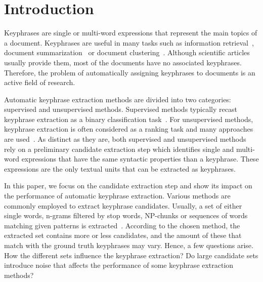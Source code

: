\section{Introduction}
\label{sec:section}
  Keyphrases are single or multi-word expressions that represent the main topics
  of a document. Keyphrases are useful in many tasks such as information
  retrieval~\cite{medelyan2008smalltrainingset}, document
  summarization~\cite{litvak2008graphbased} or document
  clustering~\cite{han2007webdocumentclustering}. Although scientific articles
  usually provide them, most of the documents have no associated keyphrases.
  Therefore, the problem of automatically assigning keyphrases to documents is
  an active field of research.

  Automatic keyphrase extraction methods are divided into two categories:
  supervised and unsupervised methods. Supervised methods typically recast
  keyphrase extraction as a binary classification
  task~\cite{witten1999kea,sujian2003maximumentropy,eichler2010keywe}. For
  unsupervised methods, keyphrase extraction is often considered as a ranking
  task and many approaches are
  used~\cite{barker2000nounphrasehead,tomokiyo2003languagemodel,mihalcea2004textrank}.
  As distinct as they are, both supervised and unsupervised methods rely on a
  preliminary candidate extraction step which identifies single and multi-word
  expressions that have the same syntactic properties than a keyphrase. These
  expressions are the only textual units that can be extracted as keyphrases.
  
  In this paper, we focus on the candidate extraction step and show its impact
  on the performance of automatic keyphrase extraction. Various methods
  are commonly employed to extract keyphrase candidates. Usually, a set of
  either single words, n-grams filtered by stop words, NP-chunks or sequences of
  words matching given patterns is extracted~\cite{hulth2003keywordextraction}.
  According to the chosen method, the extracted set contains more or less
  candidates, and the amount of these that match with the ground truth
  keyphrases may vary. Hence, a few questions arise. How the different sets
  influence the keyphrase extraction? Do large candidate sets introduce noise
  that affects the performance of some keyphrase extraction methods?

